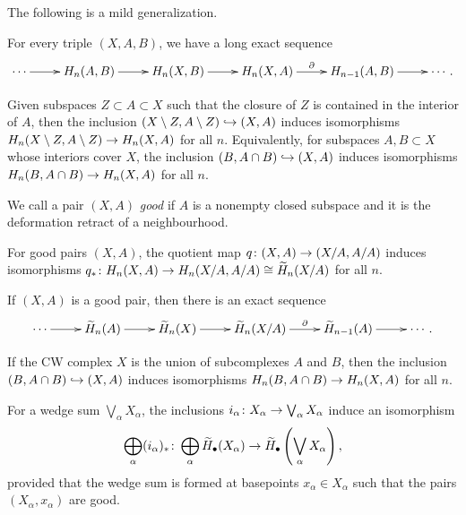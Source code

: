 The following is a mild generalization.

\begin{theorem}
  For every triple $(X,A,B)$, we have a long exact sequence
  \[\xymatrix{
    \cdots \ar[r] & H_n(A,B) \ar[r] & H_n(X,B) \ar[r] & H_n(X,A) \ar[r]^-\d & H_{n-1}(A,B) \ar[r] & \cdots.
  }\]
\end{theorem}

\begin{theorem}[Excision]
  Given subspaces $Z \subset A \subset X$ such that the closure of $Z$ is contained in the interior of $A$, then the inclusion $(X \setminus Z, A \setminus Z) \hookrightarrow (X,A)$ induces isomorphisms $H_n(X \setminus Z, A \setminus Z) \rightarrow H_n(X,A)$ for all $n$. Equivalently, for subspaces $A, B \subset X$ whose interiors cover $X$, the inclusion $(B, A \cap B) \hookrightarrow (X,A)$ induces isomorphisms $H_n(B,A \cap B) \rightarrow H_n(X,A)$ for all $n$.
\end{theorem}

We call a pair $(X,A)$ \emph{good} if $A$ is a nonempty closed subspace and it is the deformation retract of a neighbourhood.

\begin{proposition}
  For good pairs $(X,A)$, the quotient map $q \colon (X,A) \rightarrow (X/A,A/A)$ induces isomorphisms $q_\ast \colon H_n(X,A) \rightarrow H_n(X/A,A/A) \cong \widetilde{H}_n(X/A)$ for all $n$.
\end{proposition}

\begin{theorem}
  If $(X,A)$ is a good pair, then  there is an exact sequence
  \[\xymatrix{
    \cdots \ar[r] & \wtilde{H}_n(A) \ar[r] & \wtilde{H}_n(X) \ar[r] & \wtilde{H}_n(X/A) \ar[r]^-\d & \wtilde{H}_{n-1}(A) \ar[r] & \cdots.
  }\]
\end{theorem}

\begin{corollary}
  If the CW complex $X$ is the union of subcomplexes $A$ and $B$, then the inclusion $(B,A \cap B) \hookrightarrow (X,A)$ induces isomorphisms $H_n(B,A \cap B) \rightarrow H_n(X,A)$ for all $n$.
\end{corollary}

\begin{corollary}
  For a wedge sum $\bigvee_\alpha X_\alpha$, the inclusions $i_\alpha \colon X_\alpha \rightarrow \bigvee_\alpha X_\alpha$ induce an isomorphism
  \[
  \bigoplus_\alpha (i_\alpha)_\ast \colon \bigoplus_\alpha \widetilde{H}_\bullet(X_\alpha) \rightarrow \widetilde{H}_\bullet\left( \bigvee_\alpha X_\alpha \right),
  \]
  provided that the wedge sum is formed at basepoints $x_\alpha \in X_\alpha$ such that the pairs $(X_\alpha,x_\alpha)$ are good.
\end{corollary}

